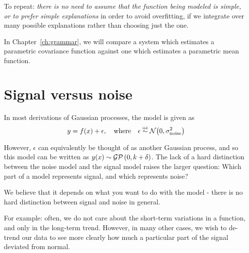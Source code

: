 To repeat: \emph{there is no need to assume that the function being modeled is simple, or to prefer simple explanations} in order to avoid overfitting, if we integrate over many possible explanations rather than choosing just the one.

In Chapter~\ref{ch:grammar}, we will compare a system which estimates a parametric covariance function against one which estimates a parametric mean function.






\section{Signal versus noise}

In most derivations of Gaussian processes, the model is given as
%
\begin{align}
y = f(x) + \epsilon, \quad \textnormal{where} \quad \epsilon \overset{\mbox{\tiny iid}}{\sim} \mathcal{N}\!\left(0,\sigma^2_{\textnormal{noise}}\right)
\end{align}

However, $\epsilon$ can equivalently be thought of as another Gaussian process, and so this model can be written as $y(x) \sim \mathcal{GP}\left(0, k + \delta \right)$.  The lack of a hard distinction between the noise model and the signal model raises the larger question:  Which part of a model represents signal, and which represents noise?

We believe that it depends on what you want to do with the model - there is no hard distinction between signal and noise in general.

For example: often, we do not care about the short-term variations in a function, and only in the long-term trend.
However, in many other cases, we wish to de-trend our data to see more clearly how much a particular part of the signal deviated from normal.

\fi
